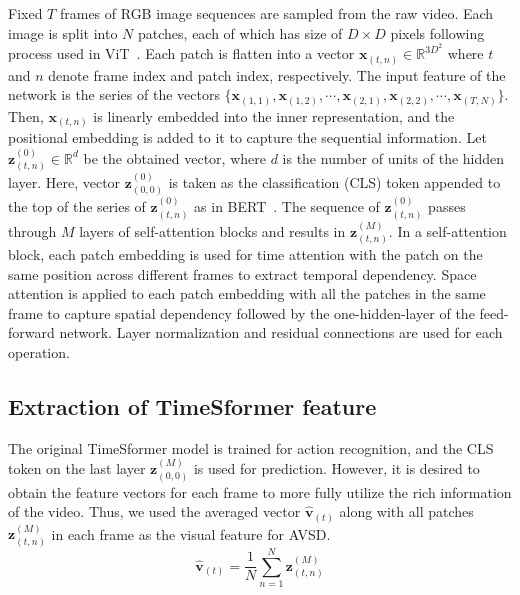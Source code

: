 \documentclass[letterpaper]{article} %
\begin{document}
Fixed $T$ frames of RGB image sequences are sampled from the raw video.
Each image is split into $N$ patches, each of which has size of $D \times D$ pixels following process used in ViT~\cite{Dosovitskiy2020image}.
Each patch is flatten into a vector $\bm{x}_{(t,n)} \in \mathbb{R}^{3D^{2}}$ where $t$ and $n$ denote frame index and patch index, respectively.
The input feature of the network is the series of the vectors $\{\bm{x}_{(1,1)}, \bm{x}_{(1,2)}, \cdots, \bm{x}_{(2,1)}, \bm{x}_{(2,2)}, \cdots, \bm{x}_{(T,N)}\}$.
Then, $\bm{x}_{(t,n)}$ is linearly embedded into the inner representation, and the positional embedding is added to it to capture the sequential information.
Let $\bm{z}^{(0)}_{(t,n)} \in \mathbb{R}^{d}$ be the obtained vector, where $d$ is the number of units of the hidden layer.
Here, vector $\bm{z}^{(0)}_{(0,0)}$ is taken as the classification (CLS) token appended to the top of the series of $\bm{z}^{(0)}_{(t,n)}$ as in BERT~\cite{Devlin2018bert}.
The sequence of $\bm{z}^{(0)}_{(t,n)}$ passes through $M$ layers of self-attention blocks and results in $\bm{z}^{(M)}_{(t,n)}$.
In a self-attention block, each patch embedding is used for time attention with the patch on the same position across different frames to extract temporal dependency.
Space attention is applied to each patch embedding with all the patches in the same frame to capture spatial dependency followed by the one-hidden-layer of the feed-forward network.
Layer normalization and residual connections are used for each operation.

\subsection{Extraction of TimeSformer feature}
The original TimeSformer model is trained for action recognition, and the CLS token on the last layer $\bm{z}^{(M)}_{(0,0)}$ is used for prediction.
% 
However, it is desired to obtain the feature vectors for each frame to more fully utilize the rich information of the video.
Thus, we used the averaged vector $\bm{\hat{v}}_{(t)}$ along with all patches $\bm{z}^{(M)}_{(t,n)}$ in each frame as the visual feature for AVSD.
\begin{equation}
  \bm{\hat{v}}_{(t)} = \frac{1}{N}\sum_{n=1}^{N}\bm{z}^{(M)}_{(t,n)}
\end{equation}
\end{document}
